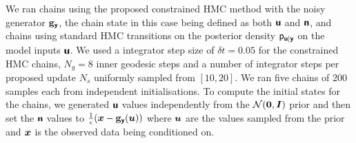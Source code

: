 

We ran chains using the proposed constrained \ac{HMC} method with the noisy generator ${\mathbf{g}}_{\boldsymbol{\mathsf{y}}}$, the chain state in this case being defined as both $\boldsymbol{\mathsf{u}}$ and $\boldsymbol{\mathsf{n}}$, and chains using standard \ac{HMC} transitions on the posterior density $\mathsf{p}_{\boldsymbol{\mathsf{u}}|\boldsymbol{\mathsf{y}}}$ on the model inputs $\boldsymbol{\mathsf{u}}$. We used a integrator step size of $\delta t = 0.05$ for the constrained \ac{HMC} chains, $N_g = 8$ inner geodesic steps and a number of integrator steps per proposed update $N_s$ uniformly sampled from $[10,20]$. We ran five chains of 200 samples each from independent initialisations. To compute the initial states for the chains, we generated $\boldsymbol{\mathsf{u}}$ values independently from the $\nrm{\vct{0},\mtx{I}}$ prior and then set the $\boldsymbol{\mathsf{n}}$ values to $\frac{1}{\epsilon} \lpa\vct{x} - \genfunc_{\rvct{y}}(\vct{u})\rpa$ where $\boldsymbol{u}$ are the values sampled from the prior and $\boldsymbol{x}$ is the observed data being conditioned on. 

